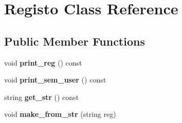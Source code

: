\hypertarget{class_registo}{\section{Registo Class Reference}
\label{class_registo}
}
\subsection*{Public Member Functions}
\begin{DoxyCompactItemize}
\item 
\hypertarget{class_registo_a17d5d8a67903e30624817b5798c6065e}{void {\bfseries print\+\_\+reg} () const }\label{class_registo_a17d5d8a67903e30624817b5798c6065e}

\item 
\hypertarget{class_registo_a80d93fbe1e4ea760aea6e3cf74a8bcce}{void {\bfseries print\+\_\+sem\+\_\+user} () const }\label{class_registo_a80d93fbe1e4ea760aea6e3cf74a8bcce}

\item 
\hypertarget{class_registo_ad0220e2d516af222c01893634eace4d4}{string {\bfseries get\+\_\+str} () const }\label{class_registo_ad0220e2d516af222c01893634eace4d4}

\item 
\hypertarget{class_registo_aa377d8fc39a2efda5ae6452f618635c2}{void {\bfseries make\+\_\+from\+\_\+str} (string reg)}\label{class_registo_aa377d8fc39a2efda5ae6452f618635c2}

\end{DoxyCompactItemize}

